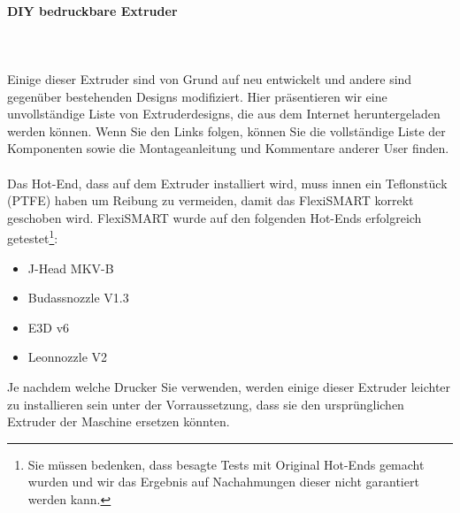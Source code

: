 \documentclass[11pt,a4paper]{article}
\begin{document}
			\paragraph{DIY bedruckbare Extruder}
\mbox{}\\\\
Einige dieser Extruder sind von Grund auf neu entwickelt und andere sind gegenüber bestehenden Designs modifiziert. Hier präsentieren wir eine unvollständige Liste von Extruderdesigns, die aus dem Internet heruntergeladen werden können. Wenn Sie den Links folgen, können Sie die vollständige Liste der Komponenten sowie die Montageanleitung und Kommentare anderer User finden.
\\\\
Das Hot-End, dass auf dem Extruder installiert wird, muss innen ein Teflonstück (PTFE) haben um Reibung zu vermeiden, damit das FlexiSMART korrekt geschoben wird. FlexiSMART wurde auf den folgenden Hot-Ends erfolgreich getestet\footnote{Sie müssen bedenken, dass besagte Tests mit Original Hot-Ends gemacht wurden und wir das Ergebnis auf Nachahmungen dieser nicht garantiert werden kann.}:
\begin{itemize}
\item J-Head MKV-B
\item Budassnozzle V1.3
\item E3D v6
\item Leonnozzle V2
\end{itemize}
Je nachdem welche Drucker Sie verwenden, werden einige dieser Extruder leichter zu installieren sein unter der Vorraussetzung, dass sie den ursprünglichen Extruder der Maschine ersetzen könnten.
\end{document}
